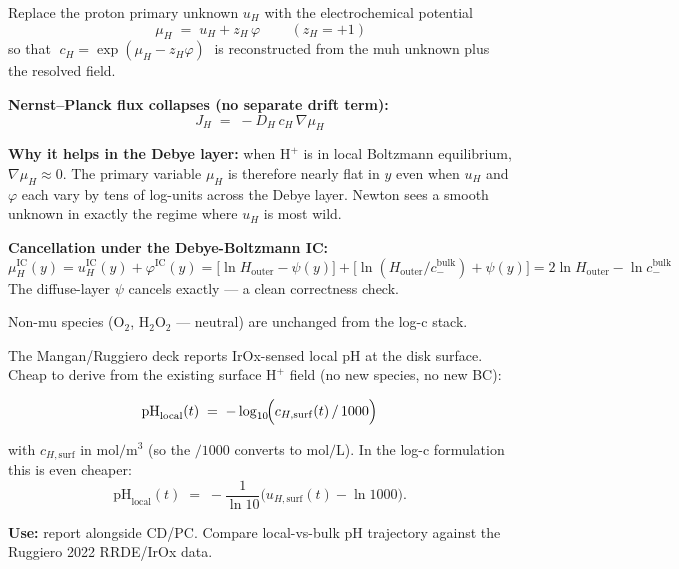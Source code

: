 \documentclass[11pt]{article}
\begin{document}
\begin{tcolorbox}[cardstyle={Electrochemical-potential ($\mu_H$) formulation}]
Replace the proton primary unknown \(u_H\) with the electrochemical
potential
\[
  \boxed{\,\mu_H \;=\; u_H + z_H\,\varphi\,} \qquad (z_H = +1)
\]
so that
\(\;c_H = \exp(\mu_H - z_H\varphi)\;\) is reconstructed from the muh
unknown plus the resolved field.

\textbf{Nernst--Planck flux collapses (no separate drift term):}
\[
  J_H \;=\; -D_H\,c_H\,\nabla\mu_H
\]

\textbf{Why it helps in the Debye layer:} when \(\mathrm{H^+}\) is in
local Boltzmann equilibrium, \(\nabla\mu_H \approx 0\). The primary
variable \(\mu_H\) is therefore nearly flat in \(y\) even when
\(u_H\) and \(\varphi\) each vary by tens of log-units across the
Debye layer. Newton sees a smooth unknown in exactly the regime where
\(u_H\) is most wild.

\textbf{Cancellation under the Debye-Boltzmann IC:}
\[
  \mu_H^{\mathrm{IC}}(y)
  = u_H^{\mathrm{IC}}(y) + \varphi^{\mathrm{IC}}(y)
  = \bigl[\ln H_{\mathrm{outer}} - \psi(y)\bigr]
   +\bigl[\ln(H_{\mathrm{outer}}/c_{-}^{\mathrm{bulk}}) + \psi(y)\bigr]
  = 2\ln H_{\mathrm{outer}} - \ln c_{-}^{\mathrm{bulk}}
\]
The diffuse-layer \(\psi\) cancels exactly --- a clean correctness
check.

Non-mu species (\(\mathrm{O_2}\), \(\mathrm{H_2O_2}\) --- neutral) are
unchanged from the log-c stack.
\end{tcolorbox}

\begin{tcolorbox}[cardstyle={Local pH observable (deck-aligned)}]
The Mangan/Ruggiero deck reports IrOx-sensed local pH at the disk
surface. Cheap to derive from the existing surface \(\mathrm{H^+}\)
field (no new species, no new BC):

\[
  \mathrm{pH}_{\mathrm{local}}(t)
   \;=\; -\log_{10}\!\Bigl(c_{H,\mathrm{surf}}(t) \,/\, 1000\Bigr)
\]

with \(c_{H,\mathrm{surf}}\) in \(\si{\mol\per\meter\cubed}\) (so the
\(/1000\) converts to \(\si{\mol\per\liter}\)). In the log-c
formulation this is even cheaper:
\[
  \mathrm{pH}_{\mathrm{local}}(t)
   \;=\; -\frac{1}{\ln 10}\bigl(u_{H,\mathrm{surf}}(t) - \ln 1000\bigr).
\]

\textbf{Use:} report alongside CD/PC. Compare local-vs-bulk pH
trajectory against the Ruggiero 2022 RRDE/IrOx data.
\end{tcolorbox}
\end{document}

